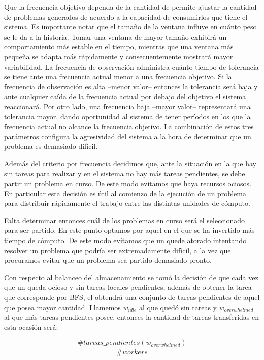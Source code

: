 Que la frecuencia objetivo dependa de la cantidad de \ws permite ajustar la
cantidad de problemas generados de acuerdo a la capacidad de consumirlos que
tiene el sistema. Es importante notar que el tamaño de la ventana influye en
cuánto peso se le da a la historia. Tomar una ventana de mayor tamaño exhibirá un comportamiento más estable en el tiempo,
mientras que una ventana más pequeña se adapta más rápidamente y consecuentemente mostrará mayor variabilidad. La frecuencia de observación administra cuánto tiempo de
tolerancia se tiene ante una frecuencia actual menor a una frecuencia
objetivo. Si la frecuencia de observación es alta --menor valor-- entonces la
tolerancia será baja y ante cualquier caída de la frecuencia actual por debajo
del objetivo el sistema reaccionará. Por otro lado, una frecuencia baja --mayor
valor-- representará una tolerancia mayor, dando oportunidad al sistema de
tener períodos en los que la frecuencia actual no alcance la frecuencia
objetivo. La combinación de estos tres parámetros configura la agresividad
del sistema a la hora de determinar que un problema es demasiado difícil.

Además del criterio por frecuencia decidimos que, ante la situación en la que hay
\ws sin tareas para realizar y en el sistema no hay más tareas pendientes, se
debe partir un problema en curso. De este modo evitamos que haya recursos
ociosos. En particular esta decisión es útil al comienzo de la ejecución de un
problema para distribuir rápidamente el trabajo entre las distintas unidades
de cómputo.

Falta determinar entonces cuál de los problemas en curso será el seleccionado
para ser partido. En este punto optamos por aquel en el que se ha
invertido más tiempo de cómputo. De este modo evitamos que un \w quede atorado
intentando resolver un problema que podría ser extremadamente difícil, a la vez
que procuramos evitar que un problema sea partido demasiado pronto.

Con respecto al balanceo del almacenamiento se tomó la decisión de que cada
vez que un \w queda ocioso y sin tareas locales pendientes, además de obtener la
tarea que corresponde por BFS, el \w obtendrá una conjunto de tareas pendientes
de aquel \w que posea mayor cantidad. Llamemos $w_{idle}$ al \w que quedó sin
tareas y $w_{overwhelmed}$ al que más tareas pendientes posee, entonces la
cantidad de tareas transferidas en esta ocasión será:

\begin{equation}
\frac{\#tareas\_pendientes(w_{overwhelmed})}{\# workers}
\label{eq:share}
\end{equation} 

